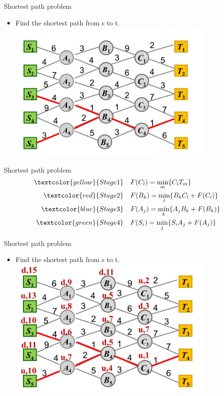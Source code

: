     \begin{frame}{Shortest path problem}
      \begin{itemize}
        \item Find the shortest path from s to t.
        \centering
        \includegraphics[width = 0.8\textwidth]{images/Shortest3.png}
      \end{itemize}
    \end{frame}

    \begin{frame}{Shortest path problem}
    \begin{equation*}
      \begin{align}
    \textcolor{yellow}{Stage 1}\quad &F(C_l) = \min_m\{C_lT_m\} \\
    \textcolor{red}{Stage 2}\quad &F(B_k) = \min_l\{B_kC_l+F(C_l)\} \\
    \textcolor{blue}{Stage 3}\quad &F(A_j) = \min_k\{A_jB_k+F(B_k)\} \\
    \textcolor{green}{Stage 4}\quad &F(S_i) = \min_j\{S_iA_j+F(A_j)\}
    \end{align}
    \end{equation*}
    \end{frame}

    \begin{frame}{Shortest path problem}
      \begin{itemize}
        \item Find the shortest path from s to t.
        \centering
        \includegraphics[width = 0.8\textwidth]{images/Shortest2.png}
      \end{itemize}
    \end{frame}
